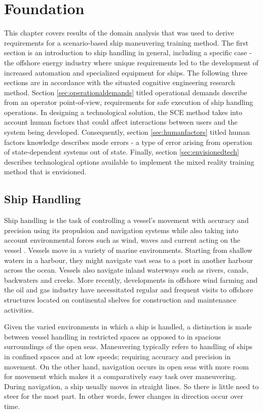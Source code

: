 \chapter{Foundation}

This chapter covers results of the domain analysis that was used to derive requirements for a scenario-based ship maneuvering training method. The first section is an introduction to ship handling in general, including a specific case - the offshore energy industry where unique requirements led to the development of increased automation and specialized equipment for ships. The following three sections are in accordance with the situated cognitive engineering research method. Section \ref{sec:operationaldemands} titled operational demands describe from an operator point-of-view, requirements for safe execution of ship handling operations. In designing a technological solution, the SCE method takes into account human factors that could affect interactions between users and the system being developed. Consequently, section \ref{sec:humanfactors} titled human factors knowledge describes mode errors - a type of error arising from operation of state-dependent systems out of state. Finally, section \ref{sec:envisionedtech} describes technological options available to implement the mixed reality training method that is envisioned.

\section{Ship Handling}

Ship handling is the task of controlling a vessel’s movement with accuracy and precision using its propulsion and navigation systems while also taking into account environmental forces such as wind, waves and current acting on the vessel \parencite{wiki:seamanship}. Vessels move in a variety of marine environments. Starting from shallow waters in a harbour, they might navigate vast seas to a port in another harbour across the ocean. Vessels also navigate inland waterways such as rivers, canals, backwaters and creeks. More recently, developments in offshore wind farming and the oil and gas industry have necessitated regular and frequent visits to offshore structures located on continental shelves for construction and maintenance activities. 

Given the varied environments in which a ship is handled, a distinction is made between vessel handling in restricted spaces as opposed to in spacious surroundings of the open seas. Maneuvering typically refers to handling of ships in confined spaces and at low speeds; requiring accuracy and precision in movement. On the other hand, navigation occurs in open seas with more room for movement which makes it a comparatively easy task over maneuvering. During navigation, a ship usually moves in straight lines. So there is little need to steer for the most part. In other words, fewer changes in direction occur over time. 

